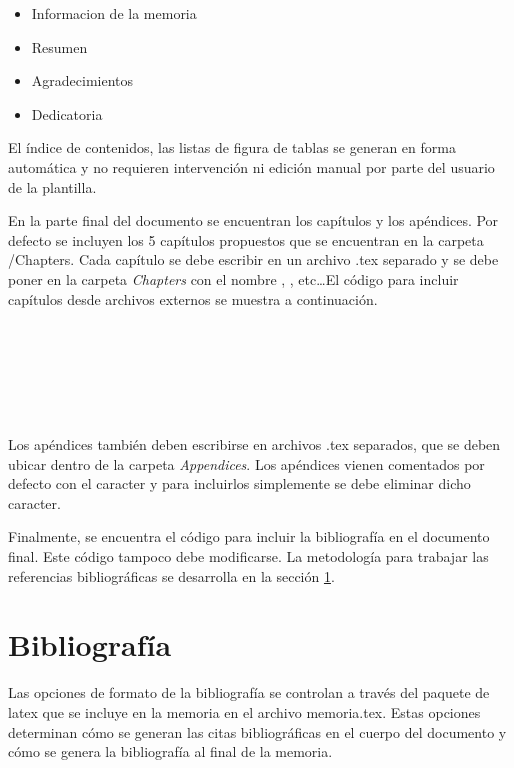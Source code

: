 \begin{itemize}
	\item Informacion de la memoria
	\item Resumen
	\item Agradecimientos
	\item Dedicatoria
\end{itemize}

El índice de contenidos, las listas de figura de tablas se generan en forma automática y no requieren intervención ni edición manual por parte del usuario de la plantilla. 

En la parte final del documento se encuentran los capítulos y los apéndices.  Por defecto se incluyen los 5 capítulos propuestos que se encuentran en la carpeta /Chapters. Cada capítulo se debe escribir en un archivo .tex separado y se debe poner en la carpeta \emph{Chapters} con el nombre , , etc\ldots El código para incluir capítulos desde archivos externos se muestra a continuación.

\begin{verbatim}
	
	 
	
	 
	 
\end{verbatim}

Los apéndices también deben escribirse en archivos .tex separados, que se deben ubicar dentro de la carpeta \emph{Appendices}. Los apéndices vienen comentados por defecto con el caracter \code{\%} y para incluirlos simplemente se debe eliminar dicho caracter.

Finalmente, se encuentra el código para incluir la bibliografía en el documento final.  Este código tampoco debe modificarse. La metodología para trabajar las referencias bibliográficas se desarrolla en la sección \ref{sec:biblio}.

\section{Bibliografía}
\label{sec:biblio}

Las opciones de formato de la bibliografía se controlan a través del paquete de latex  que se incluye en la memoria en el archivo memoria.tex.  Estas opciones determinan cómo se generan las citas bibliográficas en el cuerpo del documento y cómo se genera la bibliografía al final de la memoria.

